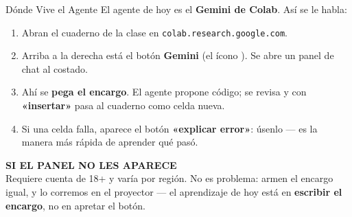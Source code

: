 \documentclass[aspectratio=169, 11pt]{beamer}
\begin{document}
\begin{frame}[shrink=5]{Dónde Vive el Agente}
  \vspace{2pt}
  {\scriptsize\color{textMuted}
   El agente de hoy es el \textbf{Gemini de Colab}. Así se le habla:}
  \vspace{2pt}
  {\scriptsize\color{textMuted}
  \begin{enumerate}\setlength{\itemsep}{3pt}
    \item Abran el cuaderno de la clase en \texttt{colab.research.google.com}.
    \item Arriba a la derecha está el botón \textbf{Gemini} (el ícono
          ). Se abre un panel de chat al costado.
    \item Ahí se \textbf{pega el encargo}. El agente propone código; se
          revisa y con \textbf{«insertar»} pasa al cuaderno como celda nueva.
    \item Si una celda falla, aparece el botón \textbf{«explicar error»}:
          úsenlo --- es la manera más rápida de aprender qué pasó.
  \end{enumerate}}
  \vspace{2pt}
  \begin{tcolorbox}[colback=arcaGray, colframe=arcaRed, boxrule=0pt,
    leftrule=3pt, arc=3pt, left=8pt, right=8pt, top=4pt, bottom=4pt]
    {\scriptsize\color{arcaRed}\bfseries SI EL PANEL NO LES APARECE}\\[3pt]
    {\scriptsize\color{textMuted}
     Requiere cuenta de 18+ y varía por región. No es problema: armen el
     encargo igual, y lo corremos en el proyector --- el aprendizaje de hoy
     está en \textbf{escribir el encargo}, no en apretar el botón.}
  \end{tcolorbox}
\end{frame}
\end{document}
